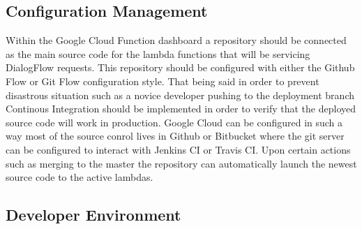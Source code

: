 \documentclass[9pt,software]{livecoms}
\begin{document}
\subsection{Configuration Management}
Within the Google Cloud Function dashboard a repository should be connected as the main source code for the lambda functions that will be servicing DialogFlow requests. This repository should be configured
with either the Github Flow or Git Flow configuration style. That being said in order to prevent disastrous situation such as a novice developer pushing to the deployment branch Continous Integration should
be implemented in order to verify that the deployed source code will work in production. Google Cloud can be configured in such a way most of the source conrol lives in Github or Bitbucket where the git server
can be configured to interact with Jenkins CI or Travis CI. Upon certain actions such as merging to the master the repository can automatically launch the newest source code
to the active lambdas.

\subsection{Developer Environment}







\end{document}
